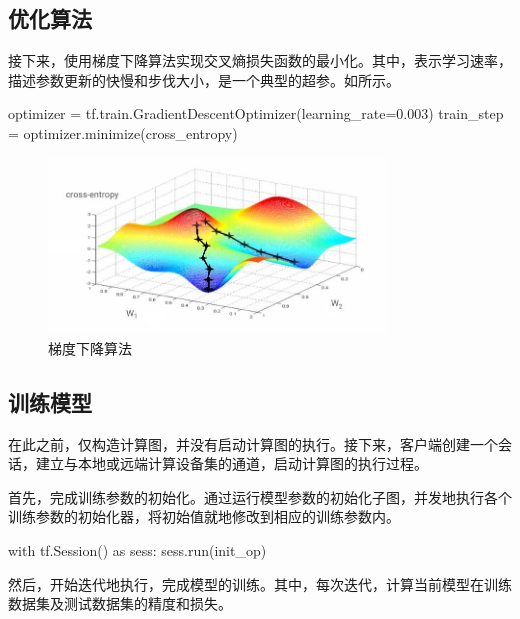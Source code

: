 \begin{content}
\subsection{优化算法}

接下来，使用梯度下降算法实现交叉熵损失函数的最小化。其中，表示学习速率，描述参数更新的快慢和步伐大小，是一个典型的超参。如所示。

\begin{leftbar}
\begin{python}
optimizer = tf.train.GradientDescentOptimizer(learning_rate=0.003)
train_step = optimizer.minimize(cross_entropy)
\end{python}
\end{leftbar}

\begin{figure}[H]
\centering
\includegraphics[width=0.8\textwidth]{figures/mnist-gd.jpeg}
\caption{梯度下降算法}
 \label{fig:mnist-gd}
\end{figure}

\subsection{训练模型}

在此之前，\tf{}仅构造计算图，并没有启动计算图的执行。接下来，客户端创建一个会话，建立与本地或远端计算设备集的通道，启动计算图的执行过程。

首先，完成训练参数的初始化。通过运行模型参数的初始化子图，并发地执行各个训练参数的初始化器，将初始值就地修改到相应的训练参数内。

\begin{leftbar}
\begin{python}
with tf.Session() as sess:
  sess.run(init_op)
\end{python}
\end{leftbar}

然后，开始迭代地执行，完成模型的训练。其中，每次迭代，计算当前模型在训练数据集及测试数据集的精度和损失。


\end{content}
